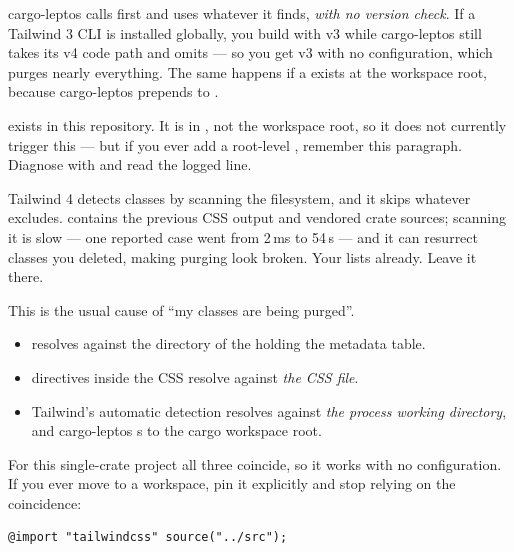 \begin{pitfall}
cargo-leptos calls  first and uses whatever it finds,
\emph{with no version check}. If a Tailwind 3 CLI is installed globally, you build with v3 while
cargo-leptos still takes its v4 code path and omits  --- so you get v3 with no
configuration, which purges nearly everything. The same happens if a  exists at
the workspace root, because cargo-leptos prepends  to .

 exists in this repository. It is in , not the workspace
root, so it does not currently trigger this --- but if you ever add a root-level
, remember this paragraph. Diagnose with  and read
the logged  line.
\end{pitfall}

\begin{pitfall}
Tailwind 4 detects classes by scanning the filesystem, and it skips whatever 
excludes.  contains the previous CSS output and vendored crate sources; scanning it is
slow --- one reported case went from 2\,ms to 54\,s --- and it can resurrect classes you deleted,
making purging look broken. Your  lists  already. Leave it there.
\end{pitfall}

\begin{pitfall}
This is the usual cause of ``my classes are being purged''.
\begin{itemize}
  \item {} resolves against the directory of the  holding
    the metadata table.
  \item {} directives inside the CSS resolve against \emph{the CSS file}.
  \item Tailwind's automatic detection resolves against \emph{the process working directory}, and
    cargo-leptos s to the cargo workspace root.
\end{itemize}
For this single-crate project all three coincide, so it works with no configuration. If you ever
move to a workspace, pin it explicitly and stop relying on the coincidence:
\begin{lstlisting}[style=sh]
@import "tailwindcss" source("../src");
\end{lstlisting}
\end{pitfall}

